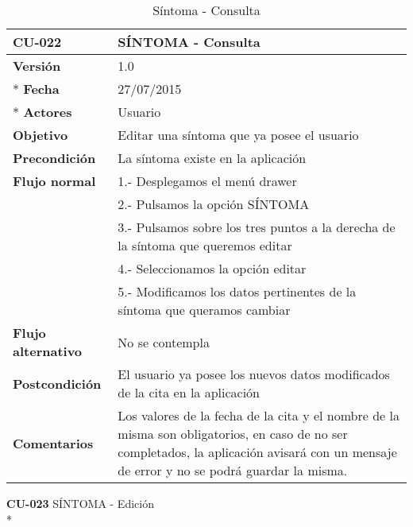 \documentclass[../pfc.tex]{subfiles}
\begin{document}
	\begin{table}[H]
		\centering
		\begin{tabular}[t]{|p{3cm}|p{9.5cm}|}
			\hline \textbf{CU-022} & \textbf{SÍNTOMA - Consulta} \\*
			\hline\hline \textbf{Versión} & 1.0 \\ *
			\hline\hline \textbf{Fecha} & 27/07/2015 \\ *
			\hline\textbf{Actores} 	& Usuario\\*
			\hline \textbf{Objetivo} & Editar una síntoma que ya posee el usuario\\* 			
			\hline \textbf{Precondición} & La síntoma existe en la aplicación\\* 
			\hline \textbf{Flujo normal} & 1.- Desplegamos el menú drawer \\* 
			& 2.- Pulsamos la opción SÍNTOMA\\*	
			& 3.- Pulsamos sobre los tres puntos a la derecha de la síntoma que queremos editar\\*	
			& 4.- Seleccionamos la opción editar\\*	
			& 5.- Modificamos los datos pertinentes de la síntoma que queramos cambiar\\*	
			\hline \textbf{Flujo alternativo} & No se contempla \\* 
			\hline \textbf{Postcondición} & El usuario ya posee los nuevos datos modificados de la cita en la aplicación \\* 
			\hline \textbf{Comentarios}   & Los valores de la fecha de la cita y el nombre de la misma son obligatorios, en caso de no ser completados, la aplicación avisará con un mensaje de error y no se podrá guardar la misma.\\*
			\hline
		\end{tabular}
		\caption{Síntoma - Consulta}
		\label{tabla:caso022}
	\end{table}
	
	\textbf{CU-023}	SÍNTOMA - Edición\\*
	
\end{document}
